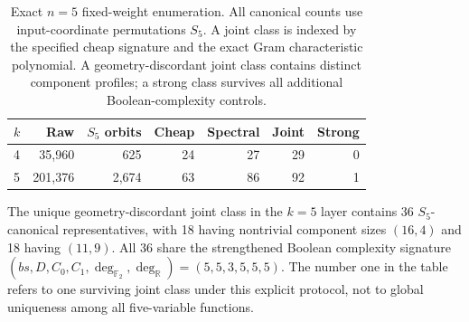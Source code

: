 \begin{table}[H]
\centering
\caption{Exact $n=5$ fixed-weight enumeration. All canonical counts use
input-coordinate permutations $S_5$. A joint class is indexed by the
specified cheap signature and the exact Gram characteristic polynomial.
A geometry-discordant joint class contains distinct component profiles;
a strong class survives all additional Boolean-complexity controls.}
\label{tab:searchcounts}
\begin{tabular}{lrrrrrr}
\toprule
$k$ & Raw & $S_5$ orbits & Cheap & Spectral & Joint & Strong\\
\midrule
4 & 35,960 & 625 & 24 & 27 & 29 & 0\\
5 & 201,376 & 2,674 & 63 & 86 & 92 & 1\\
\bottomrule
\end{tabular}
\end{table}

The unique geometry-discordant joint class in the $k=5$ layer
contains 36 $S_5$-canonical representatives, with 18 having
nontrivial component sizes $(16,4)$ and 18 having $(11,9)$.
All 36 share the strengthened Boolean complexity signature
$(bs,D,C_0,C_1,\deg_{\mathbb F_2},\deg_{\mathbb R})
=(5,5,3,5,5,5)$. The number one in the table refers to one
surviving joint class under this explicit protocol, not to
global uniqueness among all five-variable functions.
